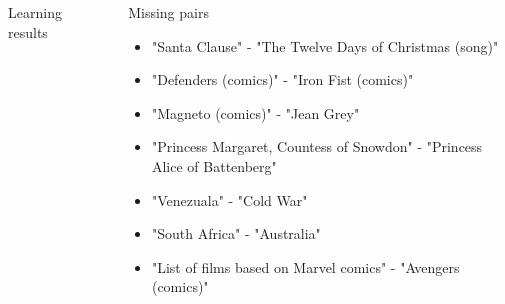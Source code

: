 \documentclass[final]{beamer}
\newlength{\sepwid}
\newlength{\onecolwid}
\newlength{\twocolwid}
\begin{document}
\begin{frame}[t]
\begin{columns}[t]
\begin{column}{\twocolwid}
\begin{columns}[t,totalwidth=\twocolwid]
\begin{column}{\onecolwid}
\begin{block}{Learning results}
\end{block}


\end{column} %

\end{columns} %

\end{column} %

\begin{column}{\sepwid}\end{column} %

\begin{column}{\onecolwid} %


\begin{block}{Missing pairs}
  \begin{itemize}
    \item "Santa Clause" - "The Twelve Days of Christmas (song)"
    \item "Defenders (comics)" - "Iron Fist (comics)"
    \item "Magneto (comics)" - "Jean Grey"
    \item "Princess Margaret, Countess of Snowdon" - "Princess Alice of Battenberg"
    \item "Venezuala" - "Cold War"
    \item "South Africa" - "Australia"
    \item "List of films based on Marvel comics" - "Avengers (comics)"
  \end{itemize}

\end{block}





\end{column}
\end{columns}
\end{frame}
\end{document}

